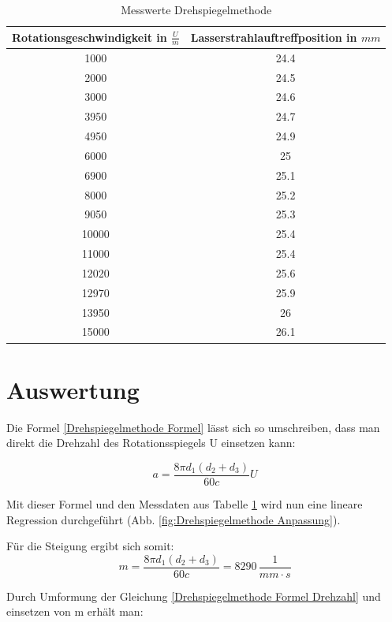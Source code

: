 \begin{table}[h]
    \centering
    \caption{Messwerte Drehspiegelmethode}
    \label{tab:Messwerte Drehspiegelmethode}
    \begin{tabular}{c c}
    \hline
    Rotationsgeschwindigkeit in $\frac{U}{m}$ & Lasserstrahlauftreffposition in $mm$ \\
    \hline
    1000 & 24.4 \\
    2000 & 24.5 \\
    3000 & 24.6 \\
    3950 & 24.7  \\
    4950 & 24.9 \\
    6000 & 25 \\
    6900 & 25.1\\
    8000 & 25.2 \\
    9050 & 25.3 \\
    10000 & 25.4 \\
    11000 & 25.4 \\
    12020 & 25.6 \\
    12970 & 25.9 \\
    13950 & 26 \\
    15000 & 26.1 \\
    \hline
    \end{tabular}
\end{table}

\section{Auswertung}

Die Formel \ref{Drehspiegelmethode Formel} lässt sich so umschreiben, dass man direkt die Drehzahl des Rotationsspiegels U einsetzen kann: 

\begin{equation} \label{Drehspiegelmethode Formel Drehzahl}
    a = \frac{8 \pi  d_1 (d_2 + d_3)}{60c} U
\end{equation}

Mit dieser Formel und den Messdaten aus Tabelle \ref{tab:Messwerte Drehspiegelmethode} wird nun eine lineare Regression durchgeführt (Abb. \ref{fig:Drehspiegelmethode Anpassung}).

Für die Steigung ergibt sich somit: 
\begin{equation} \label{Steigung Drehspiegelmethode}
    m = \frac{8 \pi  d_1 (d_2 + d_3)}{60c} = 8290 \, \frac{1}{mm\cdot s}
\end{equation}

Durch Umformung der Gleichung \ref{Drehspiegelmethode Formel Drehzahl} und einsetzen von m erhält man:

